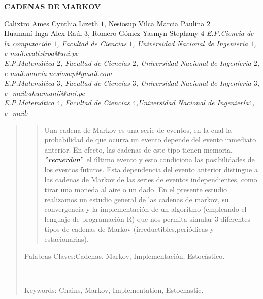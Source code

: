 \documentclass[10pt,a4paper]{article}
\theoremstyle{definition}
\theoremstyle{remark}
\begin{document}
\begin{center}
 {\Large \textbf{CADENAS DE MARKOV}}
\end{center}
\begin{center}
Calixtro Ames Cynthia Lizeth $1$, Nesiosup Vilca Marcia Paulina $2$\\
Huamaní Inga Alex Raúl $3$, Romero Gómez Yasmyn Stephany $4$\vskip12pt
{\it E.P.Ciencia de la computación $1$, Facultad de Ciencias $1$, Universidad Nacional de Ingeniería $1$, e-mail:ccalixtroa@uni.pe \\E.P.Matemática $2$, Facultad de Ciencias $2$, Universidad Nacional de Ingeniería $2$, e-mail:marcia.nesiosup@gmail.com \\ E.P.Matemática $3$, Facultad de Ciencias $3$, Universidad Nacional de Ingeniería $3$, e-
mail:ahuamanii@uni.pe \\E.P.Matemática $4$, Facultad de Ciencias $4$,Universidad Nacional de Ingeniería$4$, e- mail:}
\end{center}
\begin{quotation}
{\small
\begin{abstract}
\noindent  Una cadena de Markov es una serie de eventos, en la cual la probabilidad de que ocurra un evento depende del evento inmediato anterior. En efecto, las cadenas de este tipo tienen memoria, $"recuerdan"$ el último evento y esto condiciona las posibilidades de los eventos futuros. Esta dependencia del evento anterior distingue a las cadenas de Markov de las series de eventos independientes, como tirar una moneda al aire o un dado. En el presente estudio realizamos un estudio general de las cadenas de markov, su convergencia y la implementación de un algoritmo (empleando el lenguaje de programación R) que nos permita simular 3 diferentes tipos de cadenas de Markov (irreductibles,periódicas y estacionarias).

\end{abstract}
\hspace*{0.5cm} Palabras Claves:Cadenas, Markov, Implementación, Estocástico.  
}\\
{\small
\hspace*{0.5cm} 

Keywords: Chains, Markov, Implementation, Estochastic. \\ 
}
\end{quotation}
\end{document}
